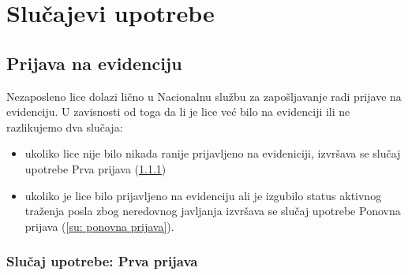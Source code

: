 \section{Slu\v cajevi upotrebe}

\subsection{Prijava na evidenciju}

Nezaposleno lice dolazi li\v cno u Nacionalnu slu\v zbu za zapo\v sljavanje radi prijave na evidenciju. U zavisnosti od toga da li je lice ve\' c bilo na evidenciji ili ne razlikujemo dva slu\v caja:

\begin{itemize}
	\item ukoliko lice nije bilo nikada ranije prijavljeno na evideniciji, izvr\v sava se slu\v caj upotrebe Prva prijava (\ref{su: prva prijava})
	\item ukoliko je lice bilo prijavljeno na evidenciju ali je izgubilo status aktivnog tra\v zenja posla zbog neredovnog javljanja izvr\v sava se slu\v caj upotrebe Ponovna prijava (\ref{su: ponovna prijava}).
\end{itemize}


\subsubsection{Slu\v caj upotrebe: Prva prijava}
\label{su: prva prijava}

